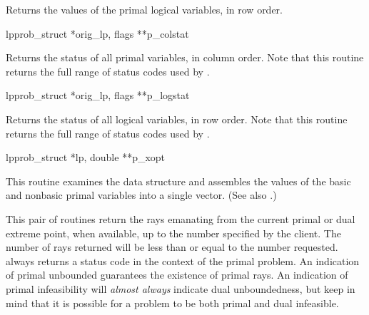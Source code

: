 \begin{subrdoc}
  Returns the values of the primal logical variables, in row order.

  \item
	  {lpprob_struct *orig_lp, flags **p_colstat}

  Returns the status of all primal variables, in column order.
  Note that this routine returns the full range of status codes used by
  \dylp.

  \item
	  {lpprob_struct *orig_lp, flags **p_logstat}

  Returns the status of all logical variables, in row order.
  Note that this routine returns the full range of status codes used by
  \dylp.

  \item
	  {lpprob_struct *lp, double **p_xopt}

  This routine examines the  data structure and assembles the values
  of the basic and nonbasic primal variables into a single vector.
  (See also .)
\end{subrdoc}


This pair of routines return the rays emanating from the current primal or
dual extreme point, when available, up to the number specified by the
client.
The number of rays returned will be less than or equal to the number
requested.
\dylp always returns a status code in the context of the primal problem.
An indication of primal unbounded guarantees the existence of primal rays.
An indication of primal infeasibility will \textit{almost always} indicate dual
unboundedness, but keep in mind that it is possible for a problem to be both
primal and dual infeasible.

